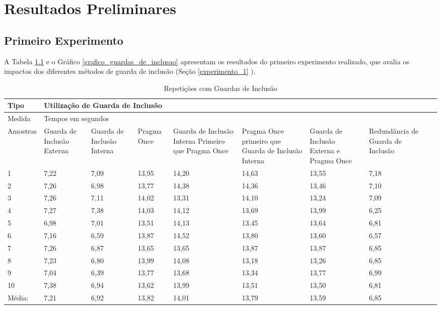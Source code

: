 \chapter[Resultados Preliminares]{Resultados Preliminares}


\section{Primeiro Experimento}

A Tabela \ref{tab:tabela_guarda_de_inclusao} e o Gráfico 
\ref{grafico_guardas_de_inclusao} apresentam os resultados
 do primeiro experimento realizado, que avalia os impactos
 dos diferentes métodos de guarda de inclusão (Seção \ref{experimento_1} ).


\begin{table}[!ht]
\centering
\caption{Repetições com Guardas de Inclusão}
\label{tab:tabela_guarda_de_inclusao}
\begin{tiny}
\begin{tabular}{|l|p{1.5cm}|p{1.5cm}|p{1.5cm}|p{1.5cm}|p{2cm}|p{2cm}|p{2cm}|p{2cm}|}
\toprule
Tipo & \multicolumn{7}{l|}{Utilização de Guarda de Inclusão} \\ \hline
Medida & \multicolumn{7}{l|}{Tempos em segundos } \\ \hline
Amostras & Guarda de Inclusão Externa & Guarda de Inclusão Interna & Pragma Once & Guarda de Inclusão Interna Primeiro que Pragma Once & Pragma Once primeiro que Guarda de Inclusão Interna & Guarda de Inclusão Externa e Pragma Once & Redundância de Guarda de Inclusão \\ \hline
 1  & 7,22 & 7,09 & 13,95  &  14,20 &14,63   &  13,55 &  7,18  \\ \hline
 2  & 7,26 & 6,98 & 13,77  &  14,38 & 14,36  &  13,46 & 7,10   \\ \hline
 3  & 7,26 & 7,11 & 14,02  &  13,31 & 14,10  &  13,24 &7,09    \\ \hline
 4  & 7,27 & 7,38 & 14,03  &  14,12 & 13,69  &  13,99 &6,25    \\ \hline
 5  & 6,98 & 7,01 & 13,51  &  14,13 & 13,45  &  13,64 &6,81    \\ \hline
 6  & 7,16 & 6,59 & 13,87  &  14,52 & 13,80  &  13,60 &6,57    \\ \hline
 7  & 7,26 & 6,87 & 13,65  &  13,65 & 13,87  &  13,87 &6,85    \\ \hline 
 8  & 7,23 & 6,80 & 13,99  &  14,08 & 13,18  &  13,26 &6,85    \\ \hline
 9  & 7,04 & 6,39 & 13,77  &  13,68 & 13,34  &  13,77 &6,99    \\ \hline
 10 & 7,38 & 6,94 & 13,62  &  13,99 & 13,51  &  13,50 &6,81    \\ \hline
 Média: & 7,21 & 6,92 & 13,82& 14,01& 13,79  &  13,59 &6,85    \\ \hline
\end{tabular}
\end{tiny}
\end{table}

